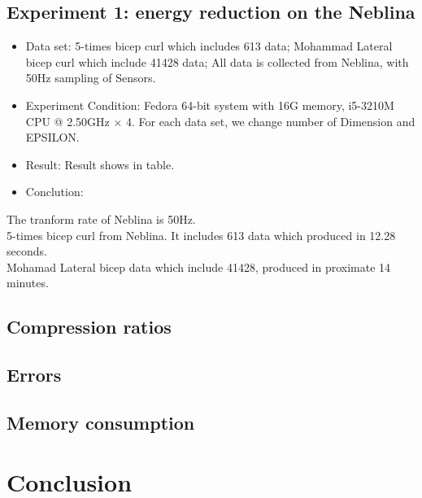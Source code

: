 \documentclass[10pt, conference, compsocconf]{IEEEtran}
\begin{document}
\subsection{Experiment 1: energy reduction on the Neblina}
\begin{itemize}
    \item Data set: 5-times bicep curl which includes 613 data; 
                    Mohammad Lateral bicep curl which include 41428 data; 
                    All data is collected from Neblina, with 50Hz sampling of Sensors.
    \item Experiment Condition: Fedora 64-bit system with 16G memory, i5-3210M CPU @ 2.50GHz × 4. For each data set, we change number of Dimension and EPSILON.
    \item Result: Result shows in table.
    \item Conclution: 
\end{itemize}



The tranform rate of Neblina is 50Hz.
\\
5-times bicep curl from Neblina. It includes 613 data which produced in 12.28 seconds. 
\\
Mohamad Lateral bicep data which include 41428, produced in proximate 14 minutes.

\subsection{Compression ratios}

\subsection{Errors}

\subsection{Memory consumption}

\section{Conclusion}
\end{document}
